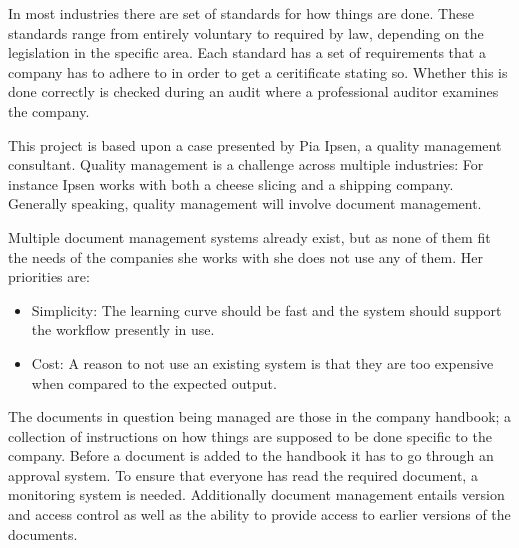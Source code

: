 In most industries there are set of standards for how things are done.
These standards range from  entirely voluntary to required by law, depending on the legislation in the specific area.
Each standard has a set of requirements that a company has to adhere to in order to get a ceritificate stating so.
Whether this is done correctly is checked during an audit where a professional auditor examines the company.

This project is based upon a case presented by Pia Ipsen, a quality management consultant.
Quality management is a challenge across multiple industries: For instance Ipsen works with both a cheese slicing and a shipping company.
Generally speaking, quality management will involve document management.

Multiple document management systems already exist, but as none of them fit the needs of the companies she works with she does not use any of them.
Her priorities are:

\begin{itemize}
\item Simplicity: The learning curve should be fast and the system should support the workflow presently in use.
\item Cost: A reason to not use an existing system is that they are too expensive when compared to the expected output.
\end{itemize}

The documents in question being managed are those in the company handbook; a collection of instructions on how things are supposed to be done specific to the company.
Before a document is added to the handbook it has to go through an approval system.
To ensure that everyone has read the required document, a monitoring system is needed.
Additionally document management entails version and access control as well as the ability to provide access to earlier versions of the documents.
